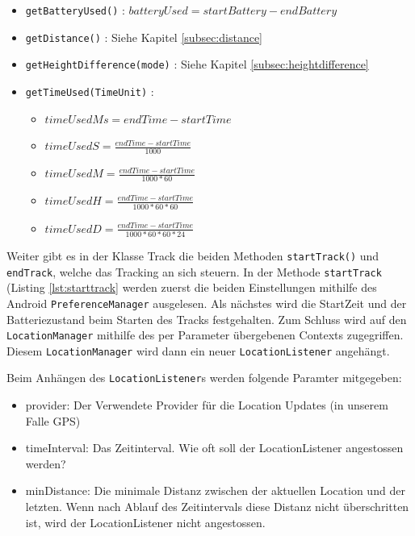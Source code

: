 \begin{itemize}
\item \lstinline$getBatteryUsed()$ : $batteryUsed = startBattery-endBattery$ 
\item \lstinline$getDistance()$ : Siehe Kapitel \ref{subsec:distance}
\item \lstinline$getHeightDifference(mode)$ : Siehe Kapitel \ref{subsec:heightdifference}
\item \lstinline$getTimeUsed(TimeUnit)$ :
\begin{itemize}
	\item $timeUsedMs = endTime-startTime$
	\item $timeUsedS = \frac{endTime-startTime}{1000}$
	\item $timeUsedM = \frac{endTime-startTime}{1000*60}$
	\item $timeUsedH = \frac{endTime-startTime}{1000*60*60}$
	\item $timeUsedD = \frac{endTime-startTime}{1000*60*60*24}$
\end{itemize}
\end{itemize}

Weiter gibt es in der Klasse Track die beiden Methoden \lstinline$startTrack()$ und \lstinline$endTrack$, welche das Tracking an sich steuern. In der Methode \lstinline$startTrack$ (Listing \ref{lst:starttrack} werden zuerst die beiden Einstellungen mithilfe des Android \lstinline$PreferenceManager$ ausgelesen. Als nächstes wird die StartZeit und der Batteriezustand beim Starten des Tracks festgehalten. Zum Schluss wird auf den \lstinline$LocationManager$ mithilfe des per Parameter übergebenen Contexts zugegriffen. Diesem \lstinline$LocationManager$ wird dann ein neuer \lstinline$LocationListener$ angehängt.

Beim Anhängen des \lstinline$LocationListener$s werden folgende Paramter mitgegeben: 
\begin{itemize}
	\item provider: Der Verwendete Provider für die Location Updates (in unserem Falle GPS)
	\item timeInterval: Das Zeitinterval. Wie oft soll der LocationListener angestossen werden?
	\item minDistance: Die minimale Distanz zwischen der aktuellen Location und der letzten. Wenn nach Ablauf des Zeitintervals diese Distanz nicht überschritten ist, wird der LocationListener nicht angestossen. \cite{locationmanager}
\end{itemize}

